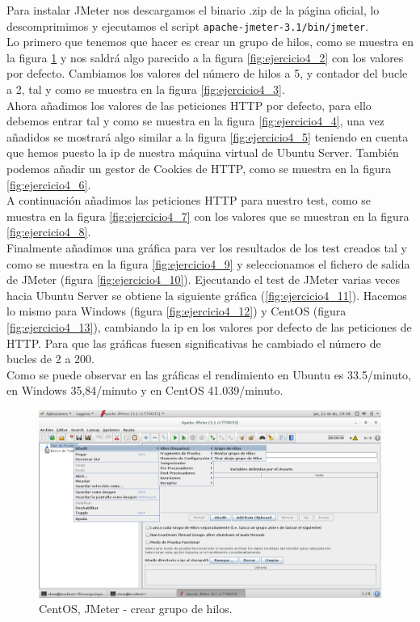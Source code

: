 Para instalar JMeter nos descargamos el binario .zip de la página oficial, lo descomprimimos y ejecutamos el script \texttt{apache-jmeter-3.1/bin/jmeter}.\\

Lo primero que tenemos que hacer es crear un grupo de hilos, como se muestra en la figura \ref{fig:ejercicio4_1} y nos saldrá algo parecido a la figura \ref{fig:ejercicio4_2} con los valores por defecto. Cambiamos los valores del número de hilos a 5, y contador del bucle a 2, tal y como se muestra en la figura \ref{fig:ejercicio4_3}.\\

Ahora añadimos los valores de las peticiones HTTP por defecto, para ello debemos entrar tal y como se muestra en la figura \ref{fig:ejercicio4_4}, una vez añadidos se mostrará algo similar a la figura \ref{fig:ejercicio4_5} teniendo en cuenta que hemos puesto la ip de nuestra máquina virtual de Ubuntu Server. También podemos añadir un gestor de Cookies de HTTP, como se muestra en la figura \ref{fig:ejercicio4_6}.\\

A continuación añadimos las peticiones HTTP para nuestro test, como se muestra en la figura \ref{fig:ejercicio4_7} con los valores que se muestran en la figura \ref{fig:ejercicio4_8}.\\

Finalmente añadimos una gráfica para ver los resultados de los test creados tal y como se muestra en la figura \ref{fig:ejercicio4_9} y seleccionamos el fichero de salida de JMeter (figura \ref{fig:ejercicio4_10}). Ejecutando el test de JMeter varias veces hacia Ubuntu Server se obtiene la siguiente gráfica (\ref{fig:ejercicio4_11}). Hacemos lo mismo para Windows (figura \ref{fig:ejercicio4_12}) y CentOS (figura \ref{fig:ejercicio4_13}), cambiando la ip en los valores por defecto de las peticiones de HTTP. Para que las gráficas fuesen significativas he cambiado el número de bucles de 2 a 200.\\

Como se puede observar en las gráficas el rendimiento en Ubuntu es 33.5/minuto, en Windows 35,84/minuto y en CentOS 41.039/minuto.


\begin{figure}[H] 
	\centering
	\includegraphics[width=14.7cm]{./img/ejercicio4_1.png} 	
	\caption{CentOS, JMeter - crear grupo de hilos.} \label{fig:ejercicio4_1}
\end{figure}

